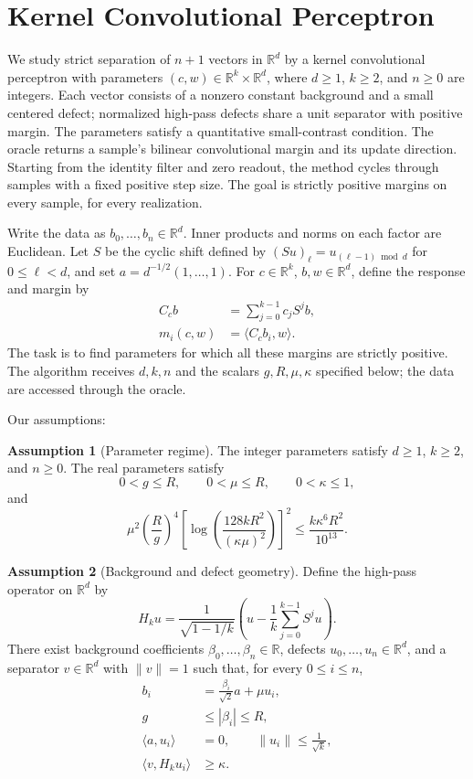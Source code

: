 \documentclass[10pt]{article}
\theoremstyle{definition}
\newtheorem{assumption}{Assumption}
\begin{document}
\section*{Kernel Convolutional Perceptron}
We study strict separation of $n+1$ vectors in $\mathbb{R}^d$ by a kernel convolutional perceptron with parameters $(c,w)\in\mathbb{R}^k\times\mathbb{R}^d$, where $d\geq1$, $k\geq2$, and $n\geq0$ are integers. Each vector consists of a nonzero constant background and a small centered defect; normalized high-pass defects share a unit separator with positive margin. The parameters satisfy a quantitative small-contrast condition. The oracle returns a sample's bilinear convolutional margin and its update direction. Starting from the identity filter and zero readout, the method cycles through samples with a fixed positive step size. The goal is strictly positive margins on every sample, for every realization.

Write the data as $b_0,\ldots,b_n\in\mathbb{R}^d$. Inner products and norms on each factor are Euclidean. Let $S$ be the cyclic shift defined by $(Su)_\ell=u_{(\ell-1)\bmod d}$ for $0\leq\ell<d$, and set $a=d^{-1/2}(1,\ldots,1)$. For $c\in\mathbb{R}^k$, $b,w\in\mathbb{R}^d$, define the response and margin by
\[
\begin{aligned}
C_c b&=\sum_{j=0}^{k-1}c_jS^j b,\\
m_i(c,w)&=\langle C_c b_i,w\rangle.
\end{aligned}
\]
The task is to find parameters for which all these margins are strictly positive. The algorithm receives $d,k,n$ and the scalars $g,R,\mu,\kappa$ specified below; the data are accessed through the oracle.

Our assumptions:
\begin{assumption}[Parameter regime]
The integer parameters satisfy $d\geq1$, $k\geq2$, and $n\geq0$. The real parameters satisfy
\[
0<g\leq R,\qquad 0<\mu\leq R,\qquad 0<\kappa\leq1,
\]
and
\[
\mu^2\left(\frac{R}{g}\right)^4
\left[\log\left(\frac{128kR^2}{(\kappa\mu)^2}\right)\right]^2
\leq \frac{k\kappa^6R^2}{10^{13}}.
\]
\end{assumption}

\begin{assumption}[Background and defect geometry]
Define the high-pass operator on $\mathbb{R}^d$ by
\[
H_k u=\frac{1}{\sqrt{1-1/k}}
\left(u-\frac{1}{k}\sum_{j=0}^{k-1}S^j u\right).
\]
There exist background coefficients $\beta_0,\ldots,\beta_n\in\mathbb{R}$, defects $u_0,\ldots,u_n\in\mathbb{R}^d$, and a separator $v\in\mathbb{R}^d$ with $\|v\|=1$ such that, for every $0\leq i\leq n$,
\[
\begin{aligned}
b_i&=\frac{\beta_i}{\sqrt{2}}a+\mu u_i,\\
g&\leq|\beta_i|\leq R,\\
\langle a,u_i\rangle&=0,\qquad \|u_i\|\leq\frac{1}{\sqrt{k}},\\
\langle v,H_k u_i\rangle&\geq\kappa.
\end{aligned}
\]
\end{assumption}
\end{document}
